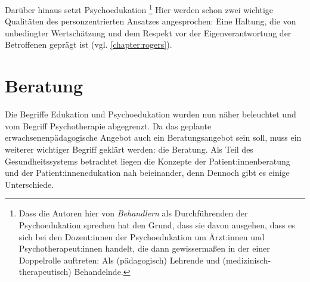 \documentclass[
  twoside,
  parskip=half-,
  paper=176mm:246mm,
  BCOR=14mm,
  DIV=14,
]{scrreprt}
\begin{document}
Darüber hinaus setzt Psychoedukation \footnote{Dass die Autoren hier von \textit{Behandlern} als Durchführenden der Psychoedukation sprechen hat den Grund, dass sie davon ausgehen, dass es sich bei den Dozent:innen der Psychoedukation um Ärzt:innen und Psychotherapeut:innen handelt, die dann gewissermaßen in der einer Doppelrolle auftreten: Als (pädagogisch) Lehrende und (medizinisch-therapeutisch) Behandelnde.} Hier werden schon zwei wichtige Qualitäten des personzentrierten Ansatzes angesprochen: Eine Haltung, die von unbedingter Wertschätzung und dem Respekt vor der Eigenverantwortung der Betroffenen geprägt ist (vgl. \autoref{chapter:rogers}).

\section{Beratung}

Die Begriffe Edukation und Psychoedukation wurden nun näher beleuchtet und vom Begriff Psychotherapie abgegrenzt. Da das geplante erwachsenenpädagogische Angebot auch ein Beratungsangebot sein soll, muss ein weiterer wichtiger Begriff geklärt werden: die Beratung. Als Teil des Gesundheitssystems betrachtet liegen die Konzepte der Patient:innenberatung und der Patient:innenedukation nah beieinander, denn  Dennoch gibt es einige Unterschiede.
\end{document}
